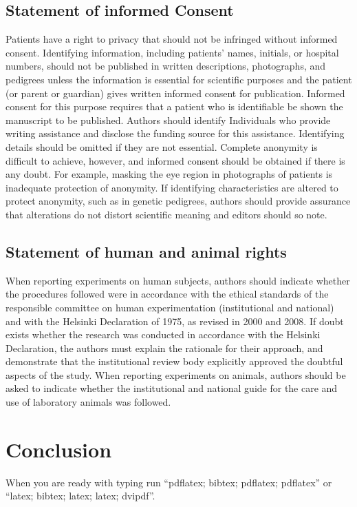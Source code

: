 \documentclass[nouppercase]{ifmbe}
\begin{document}
\subsection{Statement of informed Consent}
Patients have a right to privacy that should not be infringed without informed consent. Identifying information, including patients' names, initials, or hospital numbers, should not be published in written descriptions, photographs, and pedigrees unless the information is essential for scientific purposes and the patient (or parent or guardian) gives written informed consent for publication. Informed consent for this purpose requires that a patient who is identifiable be shown the manuscript to be published. Authors should identify Individuals who provide writing assistance and disclose the funding source for this assistance. 
Identifying details should be omitted if they are not essential. Complete anonymity is difficult to achieve, however, and informed consent should be obtained if there is any doubt. For example, masking the eye region in photographs of patients is inadequate protection of anonymity. If identifying characteristics are altered to protect anonymity, such as in genetic pedigrees, authors should provide assurance that alterations do not distort scientific meaning and editors should so note.

\subsection{Statement of human and animal rights}
When reporting experiments on human subjects, authors should indicate whether the procedures followed were in accordance with the ethical standards of the responsible committee on human experimentation (institutional and national) and with the Helsinki Declaration of 1975, as revised in 2000 and 2008. If doubt exists whether the research was conducted in accordance with the Helsinki Declaration, the authors must explain the rationale for their approach, and demonstrate that the institutional review body explicitly approved the doubtful aspects of the study. When reporting experiments on animals, authors should be asked to indicate whether the institutional and national guide for the care and use of laboratory animals was followed.


\section{Conclusion}

When you are ready with typing run ``pdflatex; bibtex; pdflatex;
pdflatex'' or ``latex; bibtex; latex; latex; dvipdf''.
\end{document}

